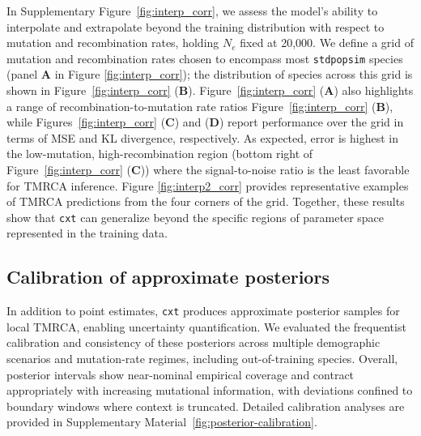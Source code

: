 \documentclass{article}
\newcommand{\cxtkit}{\texttt{cxt}\xspace}
\newcommand{\stdpopsim}{\texttt{stdpopsim}\xspace}
\begin{document}
In Supplementary Figure~\ref{fig:interp_corr}, we assess the model's ability to interpolate and extrapolate beyond the training distribution
with respect to mutation and recombination rates,  holding $N_e$ fixed at 20{,}000.
We define a grid of mutation and recombination rates chosen to encompass most \stdpopsim species (panel \textbf{A} in Figure \ref{fig:interp_corr});
the distribution of species across this grid is shown in Figure~\ref{fig:interp_corr} (\textbf{B}). 
Figure~\ref{fig:interp_corr} (\textbf{A}) also highlights a range of recombination-to-mutation rate ratios Figure~\ref{fig:interp_corr} (\textbf{B}), while Figures~\ref{fig:interp_corr} (\textbf{C}) and (\textbf{D}) report performance over the grid in terms of 
MSE and KL divergence, respectively.  
As expected, error is highest in the low-mutation, high-recombination region (bottom right of Figure~\ref{fig:interp_corr} (\textbf{C})) where the signal-to-noise ratio is the least favorable for TMRCA inference. 
Figure \ref{fig:interp2_corr} provides representative examples of TMRCA predictions from the four corners of the grid. 
Together, these results show that \cxtkit can generalize beyond the specific regions of parameter space represented in the training data.



\subsection*{Calibration of approximate posteriors}
\label{sec:calibration}

In addition to point estimates, \cxtkit produces approximate posterior samples for local TMRCA, enabling uncertainty quantification. 
We evaluated the frequentist calibration and consistency of these posteriors across multiple demographic scenarios and mutation-rate regimes, including out-of-training species.
Overall, posterior intervals show near-nominal empirical coverage and contract appropriately with increasing mutational information, with deviations confined to boundary windows where context is truncated.
Detailed calibration analyses are provided in Supplementary Material~\ref{fig:posterior-calibration}.
\end{document}
